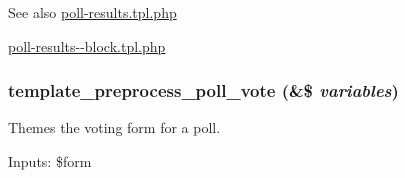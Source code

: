 \begin{DoxySeeAlso}{See also}
\hyperlink{poll-results_8tpl_8php}{poll-\/results.tpl.php} 

\hyperlink{poll-results--block_8tpl_8php}{poll-\/results-\/-\/block.tpl.php} 
\end{DoxySeeAlso}
\hypertarget{poll_8module_a480046f67169f2b0d86b0b6c3cb506da}{
\subsubsection[{template\_\-preprocess\_\-poll\_\-vote}]{\setlength{\rightskip}{0pt plus 5cm}template\_\-preprocess\_\-poll\_\-vote (\&\$ {\em variables})}}
\label{poll_8module_a480046f67169f2b0d86b0b6c3cb506da}
Themes the voting form for a poll.

Inputs: \$form 